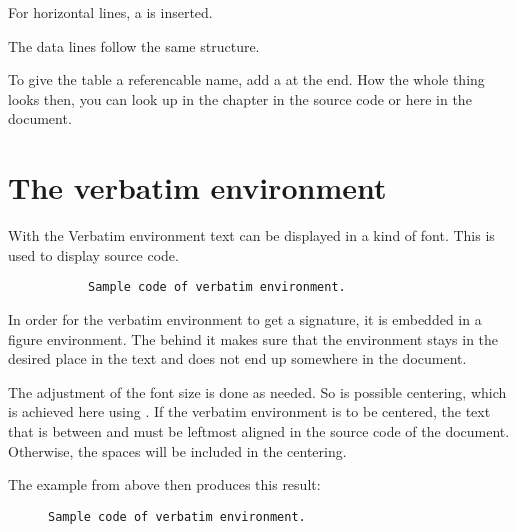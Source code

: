 For horizontal lines, a  is inserted.
\bigbreak

The data lines follow the same structure.
\bigbreak

To give the table a referencable name, add a
 at the end. How
the whole thing looks then, you can look up in the chapter
 in the source code or here in the document.

\section{The verbatim environment}

With the Verbatim environment text can be displayed in a kind of
 font. This is used to display source code.

\begin{figure}[H]
    \centering
    \begin{verbbox}
        \begin{figure}[H]
            \small
            \centering
            \begin{BVerbatim}
Sample code of verbatim environment.
            \end{BVerbatim}
        \end{figure}
    \end{verbbox}
    \theverbbox
\end{figure}

In order for the verbatim environment to get a signature, it is embedded in a
figure environment. The \tsFontCode{[H]} behind it makes sure that the
environment stays in the desired place in the text and does not end up
somewhere in the document.
\bigbreak

The adjustment of the font size is done as needed. So is possible centering,
which is achieved here using .
 If the verbatim environment is to be centered, the text that
is between  and
 must be leftmost aligned in the
source code of the document. Otherwise, the spaces will be included in the
centering.
\bigbreak

The example from above then produces this result:

\begin{figure}[H]
    \small
    \centering
    \begin{BVerbatim}
Sample code of verbatim environment.
    \end{BVerbatim}
\end{figure}

